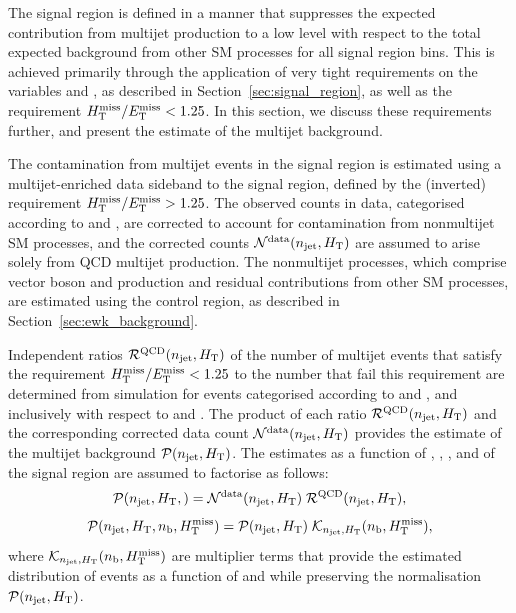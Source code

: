 The signal region is defined in a manner that suppresses the expected
contribution from multijet production to a low level with respect to
the total expected background from other SM processes for all signal
region bins. This is achieved primarily through the application of
very tight requirements on the variables \alphat and \dphi, as
described in Section~\ref{sec:signal_region}, as well as the
requirement $H_{\mathrm{T}}^{\text{miss}} / E_{\mathrm{T}}^{\text{miss}} < 1.25$. In this section, we discuss these
requirements further, and present the estimate of the multijet
background.

The contamination from multijet events in the signal region is
estimated using a multijet-enriched data sideband to the signal
region, defined by the (inverted) requirement $H_{\mathrm{T}}^{\text{miss}} / E_{\mathrm{T}}^{\text{miss}} > 1.25$. The
observed counts in data, categorised according to \njet and \scalht,
are corrected to account for contamination from nonmultijet SM
processes, and the corrected counts $\mathcal{N}^\text{data}(n_{\text{jet}},
H_{\mathrm{T}})$ are assumed to arise solely from QCD multijet
production. The nonmultijet processes, which comprise vector boson
and \ttbar production and residual contributions from other SM
processes, are estimated using the \mj control region, as
described in Section~\ref{sec:ewk_background}.

Independent ratios $\mathcal{R}^\mathrm{QCD}(n_{\text{jet}}, H_{\mathrm{T}})$ of the
number of multijet events that satisfy the requirement $H_{\mathrm{T}}^{\text{miss}} / E_{\mathrm{T}}^{\text{miss}} <
1.25$ to the number that fail this requirement are determined from
simulation for events categorised according to \njet and \scalht, and
inclusively with respect to \nb and \HTmiss. The product of each ratio
$\mathcal{R}^\mathrm{QCD}(n_{\text{jet}}, H_{\mathrm{T}})$ and the corresponding
corrected data count $\mathcal{N}^\text{data}(n_{\text{jet}}, H_{\mathrm{T}})$
provides the estimate of the multijet background $\mathcal{P}(n_{\text{jet}},
H_{\mathrm{T}})$. The estimates as a function of \njet, \scalht, \nb, and
\HTmiss of the signal region are assumed to factorise as follows:
\begin{equation}
  \label{eq:qcd1}
  \mathcal{P}( n_{\text{jet}}, H_{\mathrm{T}}, )  = 
  \mathcal{N}^\text{data}( n_{\text{jet}}, H_{\mathrm{T}} )\;
  \mathcal{R}^\mathrm{QCD}( n_{\text{jet}}, H_{\mathrm{T}} ),
\end{equation}
\begin{equation}
  \label{eq:qcd2}
  \mathcal{P}( n_{\text{jet}}, H_{\mathrm{T}}, n_{\text{b}}, H_{\mathrm{T}}^{\text{miss}} ) = 
  \mathcal{P}( n_{\text{jet}}, H_{\mathrm{T}} )\;
  \mathcal{K}_{n_{\text{jet}}, H_{\mathrm{T}}}( n_{\text{b}}, H_{\mathrm{T}}^{\text{miss}} ), 
\end{equation}
where $\mathcal{K}_{n_{\text{jet}}, H_{\mathrm{T}}}( n_{\text{b}}, H_{\mathrm{T}}^{\text{miss}} )$ are multiplier
terms that provide the estimated distribution of events as a function
of \nb and \HTmiss while preserving the normalisation $\mathcal{P}(
n_{\text{jet}}, H_{\mathrm{T}} )$.

